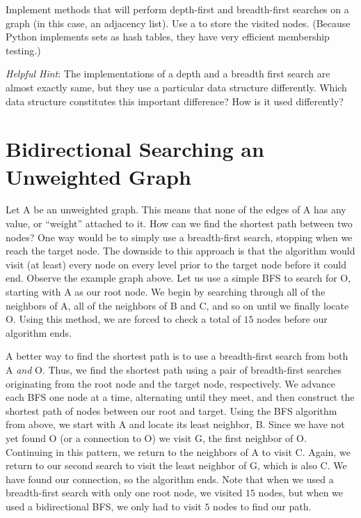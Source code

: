 \begin{problem}
Implement methods that will perform depth-first and breadth-first searches on a graph
(in this case, an adjacency list). Use a  to store the visited nodes.
(Because Python implements sets as hash tables, they have very efficient membership
testing.)

\emph{Helpful Hint}: The implementations of a depth and a breadth first search
are almost exactly same, but they use a particular data structure differently.
Which data structure constitutes this important difference? How is it used differently?
\end{problem}

\section*{Bidirectional Searching an Unweighted Graph}

Let A be an unweighted graph. This means that none of the edges of A has any value, or ``weight'' attached to it. How can we find the shortest path between two nodes?
One way would be to simply use a breadth-first search, stopping when we reach the
target node. The downside to this approach is that the algorithm would visit (at least)
every node on every level prior to the target node before it could end. Observe the example graph above.
Let us use a simple BFS to search for O, starting with A as our root node.
We begin by searching through all of the neighbors of A, all of the neighbors of B
and C, and so on until we finally locate O. Using this method, we are forced to check
a total of $15$ nodes before our algorithm ends.

A better way to find the shortest path is to use a breadth-first search from
both A \emph{and} O. Thus, we find the shortest path using a pair of breadth-first searches originating from the root node and the target node, respectively.
We advance each BFS one node at a time, alternating until they meet, and then
construct the shortest path of nodes between our root and target.
Using the BFS algorithm from above, we start with A and locate its
least neighbor, B. Since we have not yet found O (or a connection to O) we visit G,
the first neighbor of O. Continuing in this pattern, we return to the neighbors
of A to visit C. Again, we return to our second search to visit the least neighbor of
G, which is also C. We have found our connection, so the algorithm ends. Note that when we used a breadth-first
search with only one root node, we visited $15$ nodes, but when we used a bidirectional BFS, we only had to visit $5$ nodes to find our path.

